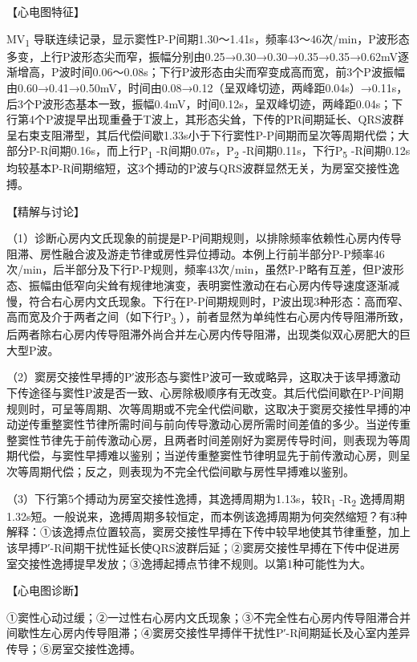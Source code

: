 【心电图特征】

MV\textsubscript{1}
导联连续记录，显示窦性P-P间期1.30～1.41s，频率43～46次/min，P波形态多变，上行P波形态尖而窄，振幅分别由0.25→0.30→0.30→0.35→0.35→0.62mV逐渐增高，P波时间0.06～0.08s；下行P波形态由尖而窄变成高而宽，前3个P波振幅由0.60→0.41→0.50mV，时间由0.08→0.12（呈双峰切迹，两峰距0.04s）→0.11s，后3个P波形态基本一致，振幅0.4mV，时间0.12s，呈双峰切迹，两峰距0.04s；下行第4个P波提早出现重叠于T波上，其形态尖耸，下传的PR间期延长、QRS波群呈右束支阻滞型，其后代偿间歇1.33s小于下行窦性P-P间期而呈次等周期代偿；大部分P-R间期0.16s，而上行P\textsubscript{1}
-R间期0.07s，P\textsubscript{2} -R间期0.11s，下行P\textsubscript{5}
-R间期0.12s均较基本P-R间期缩短，这3个搏动的P波与QRS波群显然无关，为房室交接性逸搏。

【精解与讨论】

（1）诊断心房内文氏现象的前提是P-P间期规则，以排除频率依赖性心房内传导阻滞、房性融合波及游走节律或房性异位搏动。本例上行前半部分P-P频率46次/min，后半部分及下行P-P规则，频率43次/min，虽然P-P略有互差，但P波形态、振幅由低窄向尖耸有规律地演变，表明窦性激动在右心房内传导速度逐渐减慢，符合右心房内文氏现象。下行在P-P间期规则时，P波出现3种形态：高而窄、高而宽及介于两者之间（如下行P\textsubscript{3}
），前者显然为单纯性右心房内传导阻滞所致，后两者除右心房内传导阻滞外尚合并左心房内传导阻滞，出现类似双心房肥大的巨大型P波。

（2）窦房交接性早搏的P′波形态与窦性P波可一致或略异，这取决于该早搏激动下传途径与窦性P波是否一致、心房除极顺序有无改变。其后代偿间歇在P-P间期规则时，可呈等周期、次等周期或不完全代偿间歇，这取决于窦房交接性早搏的冲动逆传重整窦性节律所需时间与前向传导激动心房所需时间差值的多少。当逆传重整窦性节律先于前传激动心房，且两者时间差刚好为窦房传导时间，则表现为等周期代偿，与窦性早搏难以鉴别；当逆传重整窦性节律明显先于前传激动心房，则呈次等周期代偿；反之，则表现为不完全代偿间歇与房性早搏难以鉴别。

（3）下行第5个搏动为房室交接性逸搏，其逸搏周期为1.13s，较R\textsubscript{1}
-R\textsubscript{2}
逸搏周期1.32s短。一般说来，逸搏周期多较恒定，而本例该逸搏周期为何突然缩短？有3种解释：①该逸搏点位置较高，窦房交接性早搏在下传中较早地使其节律重整，加上该早搏P′-R间期干扰性延长使QRS波群后延；②窦房交接性早搏在下传中促进房室交接性逸搏提早发放；③逸搏起搏点节律不规则。以第1种可能性为大。

【心电图诊断】

①窦性心动过缓；②一过性右心房内文氏现象；③不完全性右心房内传导阻滞合并间歇性左心房内传导阻滞；④窦房交接性早搏伴干扰性P′-R间期延长及心室内差异传导；⑤房室交接性逸搏。

